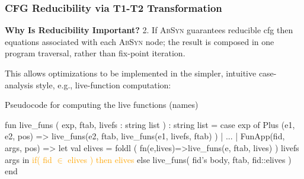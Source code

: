 \documentclass{beamer}
\newcommand{\orange}[1]{\textcolor{Orange}{{#1}}}
\renewcommand{\emph}[1]{\textcolor{structure}{#1}}
\newcommand{\emp}[1]{\textcolor{DikuRed}{ #1}}
\newcommand{\mymath}[1]{$ #1 $}
\begin{document}
\begin{frame}[fragile,t]
    \frametitle{CFG Reducibility via T1-T2 Transformation}

{\bf Why Is Reducibility Important?} 2. If \textsc{AbSyn} guarantees 
reducible {\sc cfg} then equations associated with each \textsc{AbSyn} node;
the result is composed in \emph{one program traversal}, rather than \emp{fix-point iteration}. 

\bigskip

This allows optimizations to be implemented in the simpler, 
intuitive case-analysis style, e.g., live-function computation:

\smallskip


\begin{block}{Pseudocode for computing the live functions (names)}
\begin{colorcode}[fontsize=\scriptsize]
fun live_funs ( exp, ftab, livefs : string list ) : string list =
  case exp of
    Plus (e1, e2, pos) =>
        \emph{live_funs(e2, ftab, live_funs(e1, livefs, ftab) )}
  | ...
  | FunApp(fid, args, pos) =>
        let val \emph{elives = foldl ( fn(e,lives)=>live_funs(e, ftab, lives) )} 
                         \emph{livefs args}
        in  \orange{if( fid \mymath{\in} elives ) then elives}
            \emph{else live_funs( fid's body, ftab, fid::elives )}
        end
\end{colorcode} 
\end{block}

\end{frame}
\end{document}
